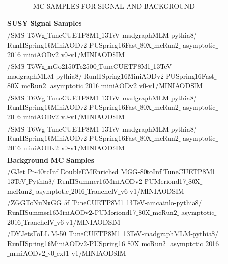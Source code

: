 \begin{table}[ht]
\caption{MC SAMPLES FOR SIGNAL AND BACKGROUND}
\label{tab:MC}
\begin{center}
\begin{tabular}{|>{\centering\arraybackslash}m{0.9\linewidth}|}
\hline
\hline
\bf{SUSY Signal Samples}   \\         
\hline                                                                                         
\small{/SMS-T5Wg$\_$TuneCUETP8M1$\_$13TeV-madgraphMLM-pythia8/
          RunIISpring16MiniAODv2-PUSpring16Fast$\_$80X$\_$mcRun2$\_$
          asymptotic$\_$2016$\_$miniAODv2$\_$v0-v1/MINIAODSIM }\\
\hline
\small{/SMS-T5Wg$\_$mGo2150To2500$\_$TuneCUETP8M1$\_$13TeV-madgraphMLM-pythia8/
          RunIISpring16MiniAODv2-PUSpring16Fast$\_$80X$\_$mcRun2$\_$ 
          asymptotic$\_$2016$\_$miniAODv2$\_$v0-v1/MINIAODSIM }\\
\hline
\small{/SMS-T6Wg$\_$TuneCUETP8M1$\_$13TeV-madgraphMLM-pythia8/ 
 		     RunIISpring16MiniAODv2-PUSpring16Fast$\_$80X$\_$mcRun2$\_$ 
		     asymptotic$\_$2016$\_$miniAODv2$\_$v0-v1/MINIAODSIM }\\
\hline
\small{/SMS-T6Wg$\_$TuneCUETP8M1$\_$13TeV-madgraphMLM-pythia8/ 
          RunIISpring16MiniAODv2-PUSpring16Fast$\_$80X$\_$mcRun2$\_$ 
          asymptotic$\_$2016$\_$miniAODv2$\_$v0-v1/MINIAODSIM }\\
\hline                                               
\bf{Background MC Samples} \\ 
\hline                                                                                      
\small{/GJet$\_$Pt-40toInf$\_$DoubleEMEnriched$\_$MGG-80toInf$\_$TuneCUETP8M1$\_$13TeV$\_$Pythia8/ 
RunIISummer16MiniAODv2-PUMoriond17$\_$80X$\_$mcRun2$\_$ 
asymptotic$\_$2016$\_$TrancheIV$\_$v6-v1/MINIAODSIM} \\
\hline
\small{/ZGGToNuNuGG$\_$5f$\_$TuneCUETP8M1$\_$13TeV-amcatnlo-pythia8/
RunIISummer16MiniAODv2-PUMoriond17$\_$80X$\_$mcRun2$\_$
asymptotic$\_$2016$\_$TrancheIV$\_$v6-v1/MINIAODSIM }\\
\hline
\small{/DYJetsToLL$\_$M-50$\_$TuneCUETP8M1$\_$13TeV-madgraphMLM-pythia8/ 
RunIISpring16MiniAODv2-PUSpring16$\_$80X$\_$mcRun2$\_$
asymptotic$\_$2016$\_$miniAODv2$\_$v0$\_$ext1-v1/MINIAODSIM }\\                     
\hline
\hline
\end{tabular}
\end{center}
\end{table}


